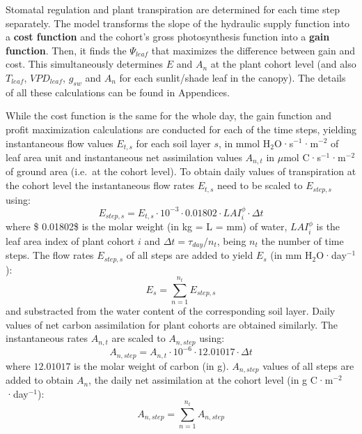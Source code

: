 \documentclass[]{book}
\begin{document}
Stomatal regulation and plant transpiration are determined for each time step separately. The model transforms the slope of the hydraulic supply function into a \textbf{cost function} and the cohort's gross photosynthesis function into a \textbf{gain function}. Then, it finds the \(\Psi_{leaf}\) that maximizes the difference between gain and cost. This simultaneously determines \(E\) and \(A_n\) at the plant cohort level (and also \(T_{leaf}\), \(VPD_{leaf}\), \(g_{sw}\) and \(A_{n}\) for each sunlit/shade leaf in the canopy). The details of all these calculations can be found in Appendices.

While the cost function is the same for the whole day, the gain function and profit maximization calculations are conducted for each of the time steps, yielding instantaneous flow values \(E_{t, s}\) for each soil layer \(s\), in mmol H\(_2\)O·s\(^{-1}\)·m\(^{-2}\) of leaf area unit and instantaneous net assimilation values \(A_{n,t}\) in \(\mu\)mol C·s\(^{-1}\)·m\(^{-2}\) of ground area (i.e.~at the cohort level). To obtain daily values of transpiration at the cohort level the instantaneous flow rates \(E_{t, s}\) need to be scaled to \(E_{step,s}\) using:
\begin{equation}
E_{step,s} = E_{t,s}\cdot 10^{-3} \cdot 0.01802 \cdot LAI_i^{\phi}\cdot \Delta t
\end{equation}
where \$ 0.01802\$ is the molar weight (in kg = L = mm) of water, \(LAI_i^{\phi}\) is the leaf area index of plant cohort \(i\) and \(\Delta t = \tau_{day}/n_t\), being \(n_t\) the number of time steps. The flow rates \(E_{step,s}\) of all steps are added to yield \(E_s\) (in mm H\(_2\)O·day\(^{-1}\)):
\begin{equation}
E_{s} = \sum_{n=1}^{n_t} {E_{step,s}}
\end{equation}
and substracted from the water content of the corresponding soil layer. Daily values of net carbon assimilation for plant cohorts are obtained similarly. The instantaneous rates \(A_{n, t}\) are scaled to \(A_{n,step}\) using:
\begin{equation}
A_{n,step} = A_{n, t} \cdot 10^{-6} \cdot 12.01017 \cdot \Delta t
\end{equation}
where \(12.01017\) is the molar weight of carbon (in g). \(A_{n, step}\) values of all steps are added to obtain \(A_n\), the daily net assimilation at the cohort level (in g C·m\(^{-2}\)·day\(^{-1}\)):
\begin{equation}
A_{n,step} = \sum_{n=1}^{n_t} {A_{n,step}}
\end{equation}
\end{document}
